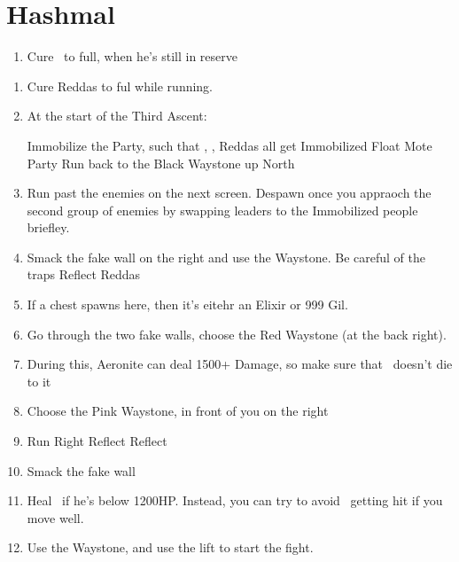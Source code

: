 \chapter{Hashmal}
\begin{enumerate}
\item Cure \vaan\ to full, when he's still in reserve
\end{enumerate}
\begin{menu}
\party{\vaan, \ashe, \penelo}
\end{menu}
\begin{enumerate}[resume]
\item Cure Reddas to ful while running.
\item At the start of the Third Ascent:
\begin{enumerate}
\penelof Immobilize the Party, such that \ashe, \penelo, Reddas all get Immobilized
\ashef Float Mote Party
\vaanf Run back to the Black Waystone up North
\end{enumerate}
\item Run past the enemies on the next screen. Despawn once you appraoch the second group of enemies by swapping leaders to the Immobilized people briefley.
\item Smack the fake wall on the right and use the Waystone. Be careful of the traps
\penelof Reflect Reddas
\item If a chest spawns here, then it's eitehr an Elixir or 999 Gil.
\item Go through the two fake walls, choose the Red Waystone (at the back right).
\item During this, Aeronite can deal 1500+ Damage, so make sure that \vaan\ doesn't die to it
\item Choose the Pink Waystone, in front of you on the right
\item Run Right
\ashef Reflect \ashe
\penelof Reflect \penelo
\item Smack the fake wall
\girlsout
\item Heal \vaan\ if he's below 1200HP. Instead, you can try to avoid \vaan\ getting hit if you move well.
\item Use the Waystone, and use the lift to start the fight.
\end{enumerate}
